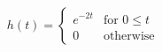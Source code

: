 \documentclass[preview]{standalone}
\begin{document}
\begin{align*}
h(t) = \begin{cases} e^{-2t} & \text{for } 0 \leq t \\ 0 & \text{otherwise} \end{cases}
\end{align*}
\end{document}
